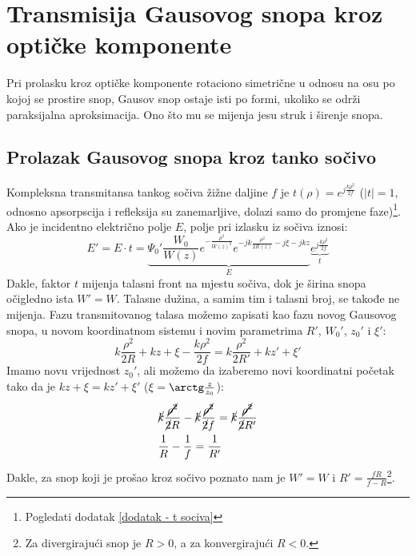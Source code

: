 \documentclass[fleqn]{report}
\begin{document}
\section{Transmisija Gausovog snopa kroz optičke komponente}

Pri prolasku kroz optičke komponente rotaciono simetrične u odnosu na osu po kojoj se prostire snop, Gausov snop ostaje isti po formi, ukoliko se održi paraksijalna aproksimacija.
Ono što mu se mijenja jesu struk i širenje snopa.

\subsection{Prolazak Gausovog snopa kroz tanko sočivo}
Kompleksna transmitansa tankog sočiva žižne daljine $f$ je $t(\rho) = e^{j\frac{k\rho^2}{2f}}$ ($|t| = 1$, odnosno apsorpscija i refleksija su zanemarljive, dolazi samo do promjene faze)\footnote{Pogledati dodatak \ref{dodatak - t sociva}}.
Ako je incidentno električno polje $E$, polje pri izlasku iz sočiva iznosi:
\begin{equation*}
    E' = E \cdot t = \underbrace{\Psi_0' \frac{W_0}{W(z)} e^{-\frac{\rho^2}{W(z)^2}} e^{-jk\frac{\rho^2}{2R(z)} - j\xi - jkz}}_E \underbrace{e^{j\frac{k\rho^2}{2f}}}_t
\end{equation*}
Dakle, faktor $t$ mijenja talasni front na mjestu sočiva, dok je širina snopa očigledno ista $W' = W$.
Talasne dužina, a samim tim i talasni broj, se takođe ne mijenja.
Fazu transmitovanog talasa možemo zapisati kao fazu novog Gausovog snopa, u novom koordinatnom sistemu i novim parametrima $R'$, $W_0'$, $z_0'$ i $\xi'$:
\begin{equation*}
    k \frac{\rho^2}{2R} + kz + \xi - \frac{k\rho^2}{2f} = k \frac{\rho^2}{2R'} + kz' + \xi'
\end{equation*}
Imamo novu vrijednost $z_0'$, ali možemo da izaberemo novi koordinatni početak tako da je $kz + \xi = kz' + \xi'$ ($\xi = \arctg\frac{z}{z_0}$):
\begin{align*}
     & \cancel{k}\frac{\cancel{\rho^2}}{\cancel{2}R} - \cancel{k}\frac{\cancel{\rho^2}}{\cancel{2}f} = \cancel{k}\frac{\cancel{\rho^2}}{\cancel{2}R'} \\
     & \frac{1}{R} - \frac{1}{f} = \frac{1}{R'}
\end{align*}
Dakle, za snop koji je prošao kroz sočivo poznato nam je $W' = W$ i $R' = \frac{fR}{f - R}$\footnote{Za divergirajući snop je $R > 0$, a za konvergirajući $R < 0$.}.
\end{document}
